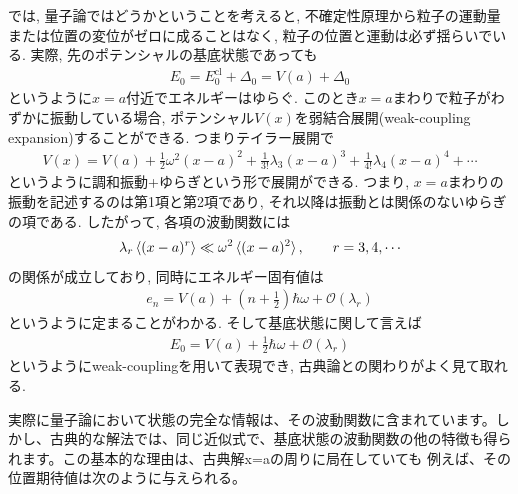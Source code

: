 \documentclass[dvipdfmx,11pt,a4paper,oneside,openany]{jsbook}
\begin{document}
では, 量子論ではどうかということを考えると, 不確定性原理から粒子の運動量または位置の変位がゼロに成ることはなく, 粒子の位置と運動は必ず揺らいでいる. 実際, 先のポテンシャルの基底状態であっても
\begin{align}
    E_0=E_{0}^{\text{cl}}+\Delta_0=V(a)+\Delta_0
\end{align}
というように$x=a$付近でエネルギーはゆらぐ. このとき$x=a$まわりで粒子がわずかに振動している場合, ポテンシャル$V(x)$を弱結合展開(weak-coupling expansion)することができる. つまりテイラー展開で
\begin{align}
    V(x)=V(a)+\frac{1}{2}\omega^2(x-a)^2+\frac{1}{3!}\lambda_3(x-a)^3+\frac{1}{4!}\lambda_4(x-a)^4+\cdots
\end{align}
というように調和振動+ゆらぎという形で展開ができる. つまり, $x=a$まわりの振動を記述するのは第1項と第2項であり, それ以降は振動とは関係のないゆらぎの項である. したがって, 各項の波動関数には
\begin{align}
    \lambda_r\braket{(x-a)^r} \ll \omega^2\braket{(x-a)^2}, \qquad r=3,4,\cdots
\end{align}
の関係が成立しており, 同時にエネルギー固有値は
\begin{align}
    e_n=V(a)+\left(n+\frac{1}{2}\right)\hbar\omega+\mathcal{O}(\lambda_r)
\end{align}
というように定まることがわかる. そして基底状態に関して言えば
\begin{align}
    E_0=V(a)+\frac{1}{2}\hbar\omega+\mathcal{O}(\lambda_r)\label{eq:5.9}
\end{align}
というようにweak-couplingを用いて表現でき, 古典論との関わりがよく見て取れる.

実際に量子論において状態の完全な情報は、その波動関数に含まれています。しかし、古典的な解法では、同じ近似式で、基底状態の波動関数の他の特徴も得られます。この基本的な理由は、古典解x=aの周りに局在していても 例えば、その位置期待値は次のように与えられる。
\end{document}
